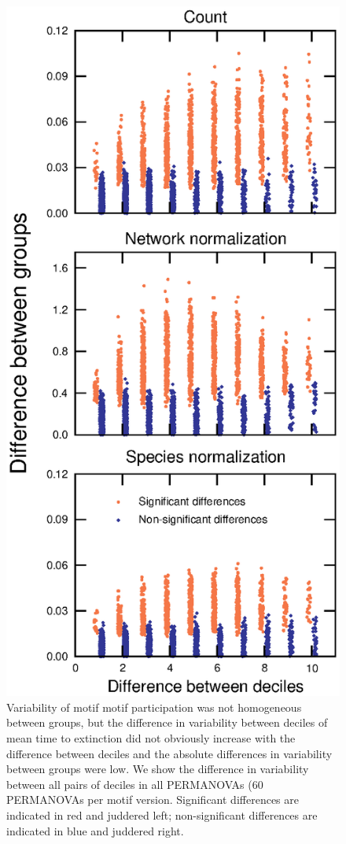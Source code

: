 \documentclass[12pt]{article}
\begin{document}
\begin{spacing}{2.0}
        \begin{figure}[h!]
            \centering
            \includegraphics[height=.75\textheight]{figures/Tukey_differences.eps}
            \caption{Variability of motif motif participation was not homogeneous between groups, but the difference in variability between deciles of mean time to extinction did not obviously increase with the difference between deciles and the absolute differences in variability between groups were low. We show the difference in variability between all pairs of deciles in all PERMANOVAs (60 PERMANOVAs per motif version. Significant differences are indicated in red and juddered left; non-significant differences are indicated in blue and juddered right.}
            \label{fig:my_label}
        \end{figure}



\end{spacing}
\end{document}
